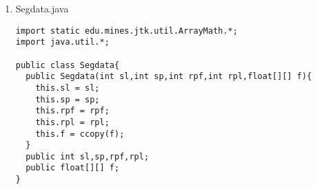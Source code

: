 \documentclass[11pt]{article}
\begin{document}
\begin{enumerate}
\begin{lstlisting}
  public void plot(Sampling s1, Sampling s2, Segdata seg, String title){
    SimplePlot sp = new SimplePlot(SimplePlot.Origin.UPPER_LEFT);
    sp.setSize(900,900);
    sp.setVLabel("Time (s)");
    if(s2.getDelta() ==1.0)
      sp.setHLabel("Station");
    else
      sp.setHLabel("Offset (km)");
    sp.setHLimits(seg.rpf, seg.rpl);
    sp.setTitle(title);
    PixelsView pv = sp.addPixels(s1,s2,seg.f);
    pv.setPercentiles(1,99);
  }

  public void tpow2(float[][] f){
    int n1 = f[0].length;
    int n2 = f.length;
    float[][] t = rampfloat(0.0f,0.002f,0.0f,n1,n2);
    mul(t,t,t);
    mul(t,f);
  }

  public void gain2(float[][] f){
    RecursiveExponentialFilter ref = new RecursiveExponentialFilter(40.0);
    for(int m = 0; m<f.length; ++m){
      if(max(abs(f))>0.0f){
        float[][] g = mul(f,f);
        ref.apply1(g,g);
        div(f,sqrt(g),f);
      }
    }
  }

  public void lowpass2(float[][] f){
    double f3db = 25.0*0.002;
    ButterworthFilter bf = new ButterworthFilter(f3db,6,ButterworthFilter.Type.LOW_PASS);
    bf.apply1ForwardReverse(f,f);
  }

  public int bcd2(byte[] b, int k){
    return (1000*((b[k  ]>>4)&0xf)+100*(b[k  ]&0xf)+
	      10*((b[k+1]>>4)&0xf)+  1*(b[k+1]&0xf));
  }

  public int bin3(byte[] b, int k){
    byte b0 = b[k  ];
    byte b1 = b[k+1];
    byte b2 = b[k+2]; 
    return (b2 & 0xFF) | ((b1 & 0xFF) << 8) | ((b0 & 0x0F) << 16);
  }

  public int bin5(byte[] b, int k){
    byte b0 = b[k  ];
    byte b1 = b[k+1];
    byte b2 = b[k+2];
    byte b3 = b[k+3];
    byte b4 = b[k+4];
    return (int)(256.0+b0*65536.0+b1*256.0+b2+b3/256.0+b4/65536.0);
  }
  
  //public String segdDir = "/gpfc/ckohnke/fc2013/segd/140/"; // Linux Lab
  public String segdDir = "/home/colton/Documents/School/SrDesign/fc2013/segd/139/"; // Laptop

  public ArrayList<Segdata> _segd;
  
}
\end{lstlisting}

\item Segdata.java
\begin{lstlisting}
import static edu.mines.jtk.util.ArrayMath.*;
import java.util.*;

public class Segdata{
  public Segdata(int sl,int sp,int rpf,int rpl,float[][] f){
    this.sl = sl;
    this.sp = sp;
    this.rpf = rpf;
    this.rpl = rpl;
    this.f = ccopy(f);
  }
  public int sl,sp,rpf,rpl;
  public float[][] f;
}


\end{lstlisting}
\end{enumerate}
\end{document}
